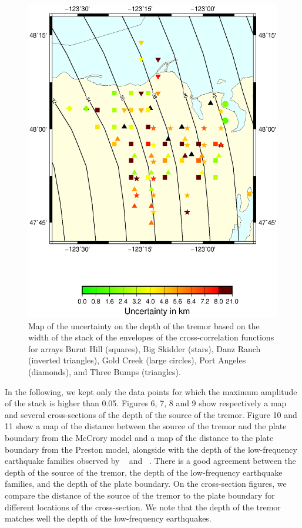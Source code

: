 \documentclass[draft]{agujournal2019}
\begin{document}
\begin{figure}
\noindent\includegraphics[width=\textwidth, trim={1cm 5cm 3.5cm 4cm},clip]{figures/uncertainty_PWS_PWS.eps}
\caption{Map of the uncertainty on the depth of the tremor based on the width of the stack of the envelopes of the cross-correlation functions for arrays Burnt Hill (squares), Big Skidder (stars), Danz Ranch (inverted triangles),  Gold Creek (large circles), Port Angeles (diamonds), and Three Bumps (triangles).}
\label{pngfiguresample}
\end{figure}

In the following, we kept only the data points for which the maximum amplitude of the stack is higher than 0.05. Figures 6, 7, 8 and 9 show respectively a map and several cross-sections of the depth of the source of the tremor. Figure 10 and 11 show a map of the distance between the source of the tremor and the plate boundary from the McCrory model and a map of the distance to the plate boundary from the Preston model, alongside with the depth of the low-frequency earthquake families observed by ~ and ~. There is a good agreement between the depth of the source of the tremor, the depth of the low-frequency earthquake families, and the depth of the plate boundary. On the cross-section figures, we compare the distance of the source of the tremor to the plate boundary for different locations of the cross-section. We note that the depth of the tremor matches well the depth of the low-frequency earthquakes.
\end{document}

